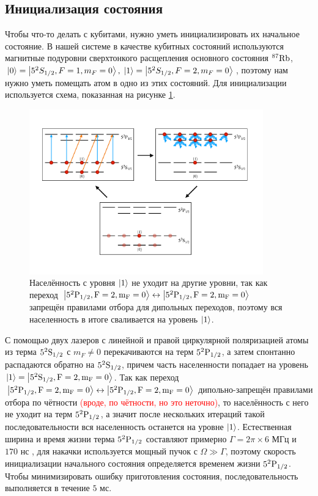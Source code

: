 \subsection{Инициализация состояния}

Чтобы что-то делать с кубитами, нужно уметь инициализировать их начальное состояние. В нашей системе в качестве кубитных состояний используются магнитные подуровни сверхтонкого расщепления основного состояния $^{87}\rm{Rb}$, $\left| 0 \right\rangle=\left| 5^2S_{1/2},F=1,m_F=0 \right\rangle, \; \left| 1 \right\rangle=\left| 5^2S_{1/2},F=2,m_F=0 \right\rangle$, поэтому нам нужно уметь помещать атом в одно из этих состояний. Для инициализации используется схема, показанная на рисунке \ref{fig:initialization}.

\begin{figure}[ht]
	\centering
	\includegraphics[width=0.9\textwidth]{images/initialization_scheme.pdf}
	\caption{Населённость с уровня $\left| 1 \right\rangle$ не уходит на другие уровни, так как переход $\left| 5^2\rm{P}_{1/2},F=2,m_F=0 \right\rangle\leftrightarrow \left| 5^2\rm{P}_{1/2},F=2,m_F=0 \right\rangle$ запрещён правилами отбора для дипольных переходов, поэтому вся населенность в итоге сваливается на уровень $\left| 1 \right\rangle$.}
	\label{fig:initialization}
\end{figure}

С помощью двух лазеров с линейной и правой циркулярной поляризацией атомы из терма $5^2\rm{S}_{1/2}$ с $m_F\neq0$ перекачиваются на терм $5^2\rm{P}_{1/2}$, а затем спонтанно распадаются обратно на $5^2\rm{S}_{1/2}$, причем часть населенности попадает на уровень $\left| 1 \right\rangle=\left| 5^2\rm{S}_{1/2},F=2,m_F=0 \right\rangle$. Так как переход $\left| 5^2\rm{P}_{1/2},F=2,m_F=0 \right\rangle\leftrightarrow \left| 5^2\rm{P}_{1/2},F=2,m_F=0 \right\rangle$ дипольно-запрещён правилами отбора по чётности \cite{Belousov} \textcolor{red}{(вроде, по чётности, но это неточно)}, то населённость с него не уходит на терм $5^2\rm{P}_{1/2}$, а значит после нескольких итераций такой последовательности вся населенность останется на уровне $\left| 1 \right\rangle$. Естественная ширина и время жизни терма $5^2\rm{P}_{1/2}$ составляют примерно $\Gamma = 2\pi \times 6 \text{ МГц}$ и $170 \text{ нс}$ \cite{Rb87}, для накачки используется мощный пучок с $\Omega \gg \Gamma$, поэтому скорость инициализации начального состояния определяется временем жизни $5^2\rm{P}_{1/2}$. Чтобы минимизировать ошибку приготовления состояния, последовательность выполняется в течение $5 \text{ мс}$.






